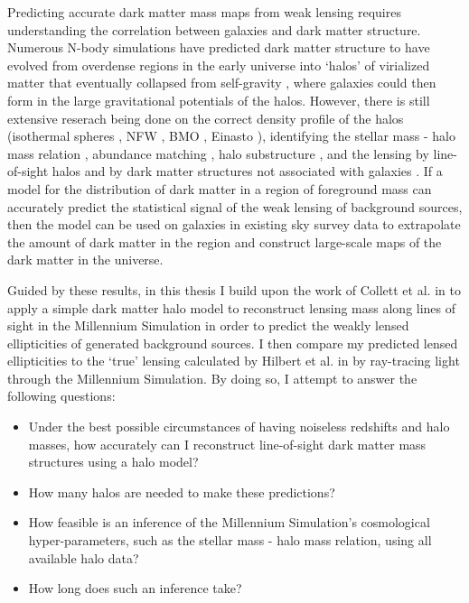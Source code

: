 \documentclass[%
 reprint,
 amsmath,amssymb,
 aps,nofootinbib
]{revtex4-1}
\begin{document}
Predicting accurate dark matter mass maps from weak lensing requires understanding the correlation between galaxies and dark matter structure. Numerous N-body simulations have predicted dark matter structure to have evolved from overdense regions in the early universe into `halos' of virialized matter that eventually collapsed from self-gravity \cite{halo_formation}, where galaxies could then form in the large gravitational potentials of the halos. However, there is still extensive reserach being done on the correct density profile of the halos (isothermal spheres \cite{isothermal_spheres}, NFW \cite{nfw}, BMO \cite{nfw_bmo}, Einasto \cite{einasto}), identifying the stellar mass - halo mass relation \cite{smhr}, abundance matching \cite{abundance_matching}, halo substructure \cite{halo_substructure}, and the lensing by line-of-sight halos \cite{collett} and by dark matter structures not associated with galaxies \cite{mccully}. If a model for the distribution of dark matter in a region of foreground mass can accurately predict the statistical signal of the weak lensing of background sources, then the model can be used on galaxies in existing sky survey data to extrapolate the amount of dark matter in the region and construct large-scale maps of the dark matter in the universe.

Guided by these results, in this thesis I build upon the work of Collett et al. in \cite{collett} to apply a simple dark matter halo model to reconstruct lensing mass along lines of sight in the Millennium Simulation in order to predict the weakly lensed ellipticities of generated background sources. I then compare my predicted lensed ellipticities to the `true' lensing calculated by Hilbert et al. in \cite{ray_tracing} by ray-tracing light through the Millennium Simulation. By doing so, I attempt to answer the following questions: 

\begin{itemize}
\item Under the best possible circumstances of having noiseless redshifts and halo masses, how accurately can I reconstruct line-of-sight dark matter mass structures using a halo model?
\item How many halos are needed to make these predictions?
\item How feasible is an inference of the Millennium Simulation's cosmological hyper-parameters, such as the stellar mass - halo mass relation, using all available halo data? 
\item How long does such an inference take?
\end{itemize}
\end{document}
